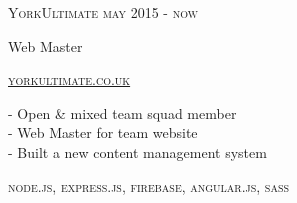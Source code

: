 {
    \textsc{\small{YorkUltimate
            \hfill
            {\raggedleft
                may 2015 - now
            }
        }
    }

    {\raggedright\large {
        Web Master
    } \\}

    \textsc{\small\href{http://www.yorkultimate.co.uk}{yorkultimate.co.uk}}

    \normalsize{
        - Open \& mixed team squad member \\
        - Web Master for team website \\
        - Built a new content management system
    }

    \textsc{\small{\color{highlight}
        node.js,
        express.js,
        firebase,
        angular.js,
        sass
    }} \\
}
